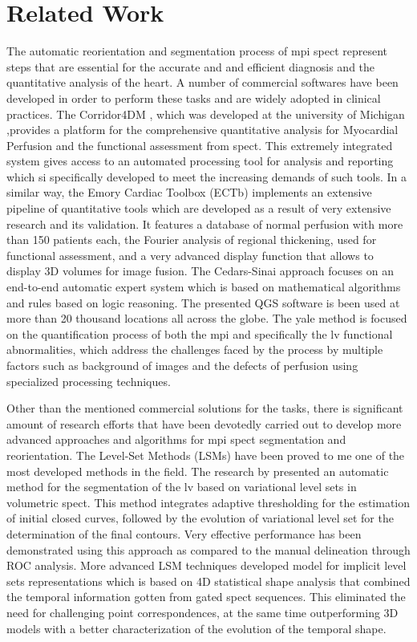 \chapter{Related Work}
\label{ch:related}

The automatic reorientation and segmentation process of \gls{mpi} \gls{spect} represent steps that are essential for the accurate and and efficient diagnosis and the quantitative analysis of the heart. A number of commercial softwares have been developed in order to perform these tasks and are widely adopted in clinical practices. The Corridor4DM \cite{FICARO2007455}, which was developed at the university of Michigan ,provides a platform for the comprehensive quantitative analysis for Myocardial Perfusion and the functional assessment from \gls{spect}. This extremely integrated system gives access to an automated processing tool for analysis and reporting which si specifically developed to meet the increasing demands of such tools. In a similar way, the Emory Cardiac Toolbox (ECTb) \cite{GARCIA2007420} implements an extensive pipeline of quantitative tools which are developed as a result of very extensive research and its validation. It features a database of normal perfusion with more than 150 patients each, the Fourier analysis of regional thickening, used for functional assessment, and a very advanced display function that allows to display 3D volumes for image fusion. The Cedars-Sinai approach \cite{GERMANO2007433} focuses on an end-to-end automatic expert system which is based on mathematical algorithms and rules based on logic reasoning. The presented QGS software is been used at more than 20 thousand locations all across the globe. The yale method \cite{LIU2007483} is focused on the quantification process of both the \gls{mpi} and specifically the \gls{lv} functional abnormalities, which address the challenges faced by the process by multiple factors such as background of images and the defects of perfusion using specialized processing techniques.

Other than the mentioned commercial solutions for the tasks, there is significant amount of research efforts that have been devotedly carried out to develop more advanced approaches and algorithms for \gls{mpi} \gls{spect} segmentation and reorientation. The Level-Set Methods (LSMs) have been proved to me one of the most developed methods in the field. The research by \cite{DBLP:journals/cars/HosntalabMMA12} presented an automatic method for the segmentation of the \gls{lv} based on variational level sets in volumetric \gls{spect}. This method integrates adaptive thresholding for the estimation of initial closed curves, followed by the evolution of variational level set for the determination of the final contours. Very effective performance has been demonstrated using this approach as compared to the manual delineation through ROC analysis. More advanced LSM techniques \cite{10.1007/11866565_12} developed model for implicit level sets representations which is based on 4D statistical shape analysis that combined the temporal information gotten from gated \gls{spect} sequences. This eliminated the need for challenging point correspondences, at the same time outperforming 3D models with a better characterization of the evolution of the temporal shape.


